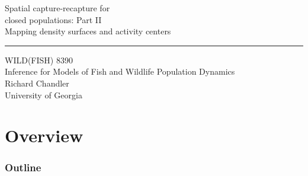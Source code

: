 \documentclass[color=usenames,dvipsnames]{beamer}\usepackage[]{graphicx}\usepackage[]{xcolor}
\begin{document}
\begin{frame}[plain]
  \LARGE
  \centering
  {
    \LARGE Spatial capture-recapture for \\
    closed populations: Part II \\
    \Large Mapping density surfaces and activity centers \\
  }
  {\color{default} \rule{\textwidth}{0.1pt} }
  \vfill
  \large
  WILD(FISH) 8390 \\
  Inference for Models of Fish and Wildlife Population Dynamics \\
  \vfill
  \large
  Richard Chandler \\
  University of Georgia \\
\end{frame}






\section{Overview}



\begin{frame}[plain]
  \frametitle{Outline}
  \Large
\end{frame}




\end{document}
